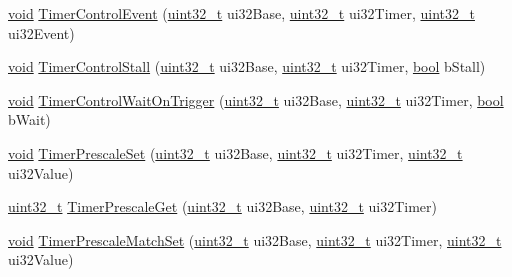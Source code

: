 \begin{DoxyCompactItemize}
\hyperlink{usb__devapi_8h_afabf60e7f57651d6d595a02c75f07cd0}{void} \hyperlink{group__timer__api_gaadd54928a2d2b06ea1ddccc440dd2d8b}{Timer\+Control\+Event} (\hyperlink{_p_e___types_8h_a33594304e786b158f3fb30289278f5af}{uint32\+\_\+t} ui32\+Base, \hyperlink{_p_e___types_8h_a33594304e786b158f3fb30289278f5af}{uint32\+\_\+t} ui32\+Timer, \hyperlink{_p_e___types_8h_a33594304e786b158f3fb30289278f5af}{uint32\+\_\+t} ui32\+Event)
\item 
\hyperlink{usb__devapi_8h_afabf60e7f57651d6d595a02c75f07cd0}{void} \hyperlink{group__timer__api_ga6987737e02bc6c83eaf585a4c052f37a}{Timer\+Control\+Stall} (\hyperlink{_p_e___types_8h_a33594304e786b158f3fb30289278f5af}{uint32\+\_\+t} ui32\+Base, \hyperlink{_p_e___types_8h_a33594304e786b158f3fb30289278f5af}{uint32\+\_\+t} ui32\+Timer, \hyperlink{_p_e___types_8h_a97a80ca1602ebf2303258971a2c938e2}{bool} b\+Stall)
\item 
\hyperlink{usb__devapi_8h_afabf60e7f57651d6d595a02c75f07cd0}{void} \hyperlink{group__timer__api_gaa5dbb6f7d793cdfd038d89ceebfc35b9}{Timer\+Control\+Wait\+On\+Trigger} (\hyperlink{_p_e___types_8h_a33594304e786b158f3fb30289278f5af}{uint32\+\_\+t} ui32\+Base, \hyperlink{_p_e___types_8h_a33594304e786b158f3fb30289278f5af}{uint32\+\_\+t} ui32\+Timer, \hyperlink{_p_e___types_8h_a97a80ca1602ebf2303258971a2c938e2}{bool} b\+Wait)
\item 
\hyperlink{usb__devapi_8h_afabf60e7f57651d6d595a02c75f07cd0}{void} \hyperlink{group__timer__api_gae04b6c4b5cd25c58910cd6789b359ae8}{Timer\+Prescale\+Set} (\hyperlink{_p_e___types_8h_a33594304e786b158f3fb30289278f5af}{uint32\+\_\+t} ui32\+Base, \hyperlink{_p_e___types_8h_a33594304e786b158f3fb30289278f5af}{uint32\+\_\+t} ui32\+Timer, \hyperlink{_p_e___types_8h_a33594304e786b158f3fb30289278f5af}{uint32\+\_\+t} ui32\+Value)
\item 
\hyperlink{_p_e___types_8h_a33594304e786b158f3fb30289278f5af}{uint32\+\_\+t} \hyperlink{group__timer__api_ga322c688af7424a3228f17745f6c01697}{Timer\+Prescale\+Get} (\hyperlink{_p_e___types_8h_a33594304e786b158f3fb30289278f5af}{uint32\+\_\+t} ui32\+Base, \hyperlink{_p_e___types_8h_a33594304e786b158f3fb30289278f5af}{uint32\+\_\+t} ui32\+Timer)
\item 
\hyperlink{usb__devapi_8h_afabf60e7f57651d6d595a02c75f07cd0}{void} \hyperlink{group__timer__api_ga98dab011e13fb097bbf6b4747150cef5}{Timer\+Prescale\+Match\+Set} (\hyperlink{_p_e___types_8h_a33594304e786b158f3fb30289278f5af}{uint32\+\_\+t} ui32\+Base, \hyperlink{_p_e___types_8h_a33594304e786b158f3fb30289278f5af}{uint32\+\_\+t} ui32\+Timer, \hyperlink{_p_e___types_8h_a33594304e786b158f3fb30289278f5af}{uint32\+\_\+t} ui32\+Value)

\end{DoxyCompactItemize}
